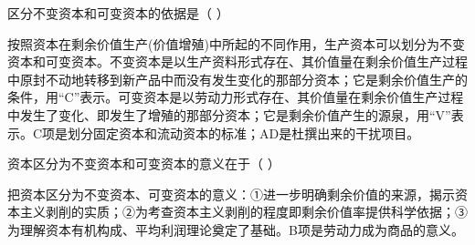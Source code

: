 \question 区分不变资本和可变资本的依据是（ ）
\par{}
\begin{solution}按照资本在剩余价值生产(价值增殖)中所起的不同作用，生产资本可以划分为不变资本和可变资本。不变资本是以生产资料形式存在、其价值量在剩余价值生产过程中原封不动地转移到新产品中而没有发生变化的那部分资本；它是剩余价值生产的条件，用``C''表示。可变资本是以劳动力形式存在、其价值量在剩余价值生产过程中发生了变化、即发生了增殖的那部分资本；它是剩余价值产生的源泉，用``V''表示。C项是划分固定资本和流动资本的标准；AD是杜撰出来的干扰项目。
\end{solution}
\question 资本区分为不变资本和可变资本的意义在于（ ）
\par{}
\begin{solution}把资本区分为不变资本、可变资本的意义：①进一步明确剩余价值的来源，揭示资本主义剥削的实质；②为考查资本主义剥削的程度即剩余价值率提供科学依据；③为理解资本有机构成、平均利润理论奠定了基础。B项是劳动力成为商品的意义。
\end{solution}
